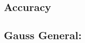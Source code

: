 \documentclass[12pt]{article}
\begin{document}
\subsection{Accuracy}

\subsection{Gauss General:}
%
%
\end{document}
